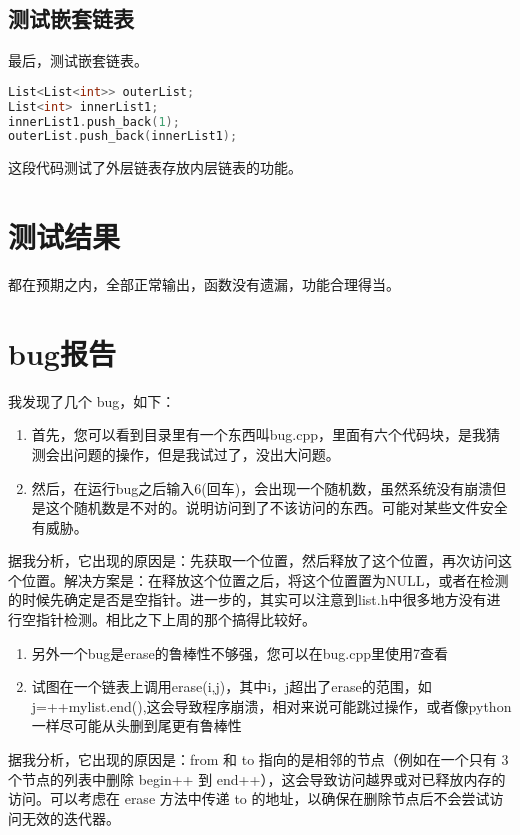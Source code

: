 \documentclass[UTF8]{ctexart}
\begin{document}
\subsection{测试嵌套链表}

最后，测试嵌套链表。

\begin{lstlisting}[language=C++]
List<List<int>> outerList;
List<int> innerList1;
innerList1.push_back(1);
outerList.push_back(innerList1);
\end{lstlisting}
这段代码测试了外层链表存放内层链表的功能。

\section{测试结果}
都在预期之内，全部正常输出，函数没有遗漏，功能合理得当。

\section{bug报告}

我发现了几个 bug，如下：

\begin{enumerate}
    \item 首先，您可以看到目录里有一个东西叫bug.cpp，里面有六个代码块，是我猜测会出问题的操作，但是我试过了，没出大问题。
    \item 然后，在运行bug之后输入6(回车)，会出现一个随机数，虽然系统没有崩溃但是这个随机数是不对的。说明访问到了不该访问的东西。可能对某些文件安全有威胁。
\end{enumerate}

据我分析，它出现的原因是：先获取一个位置，然后释放了这个位置，再次访问这个位置。解决方案是：在释放这个位置之后，将这个位置置为NULL，或者在检测的时候先确定是否是空指针。进一步的，其实可以注意到list.h中很多地方没有进行空指针检测。相比之下上周的那个搞得比较好。

\begin{enumerate}
    \item 另外一个bug是erase的鲁棒性不够强，您可以在bug.cpp里使用7查看  
    \item 试图在一个链表上调用erase(i,j)，其中i，j超出了erase的范围，如j=++mylist.end(),这会导致程序崩溃，相对来说可能跳过操作，或者像python一样尽可能从头删到尾更有鲁棒性
\end{enumerate}

据我分析，它出现的原因是：from 和 to 指向的是相邻的节点（例如在一个只有 3 个节点的列表中删除 begin++ 到 end++），这会导致访问越界或对已释放内存的访问。可以考虑在 erase 方法中传递 to 的地址，以确保在删除节点后不会尝试访问无效的迭代器。
\end{document}
